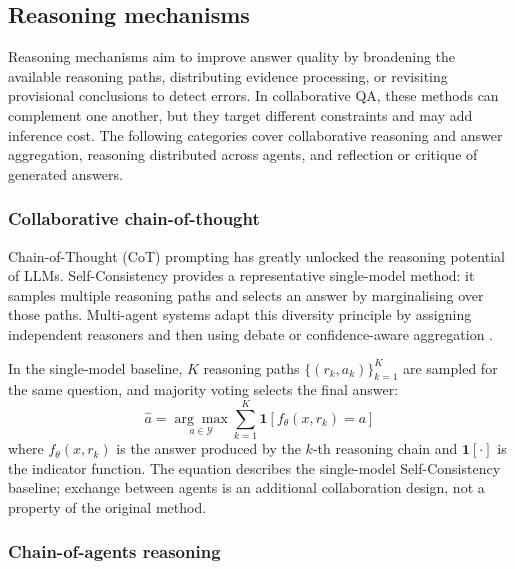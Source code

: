 \documentclass[a4paper,fleqn]{cas-dc}
\begin{document}
\subsection{Reasoning mechanisms}
\label{sec:reasoning}

Reasoning mechanisms aim to improve answer quality by broadening
the available reasoning paths, distributing evidence processing, or revisiting
provisional conclusions to detect errors. In collaborative QA, these methods
can complement one another, but they target different constraints and may add
inference cost. The following categories cover collaborative reasoning and
answer aggregation, reasoning distributed across agents, and reflection or
critique of generated answers.

\subsubsection{Collaborative chain-of-thought}
\label{sec:cot}

Chain-of-Thought (CoT) prompting \citep{wei2022chain_of_thought} has
greatly unlocked the reasoning potential of LLMs.
Self-Consistency \citep{wang2023self_consistency} provides a representative
single-model method: it samples multiple reasoning paths and selects an answer
by marginalising over those paths. Multi-agent systems adapt this diversity
principle by assigning independent
reasoners and then using debate or confidence-aware aggregation
\citep{du2024multiagent_debate,chen2024reconcile}.

In the single-model baseline, $K$ reasoning paths
$\{(r_k, a_k)\}_{k=1}^{K}$ are sampled for the same question, and majority
voting selects the final answer:
\begin{equation}
  \hat{a} = \underset{a\in\mathcal{Y}}{\arg\max}\sum_{k=1}^{K}
  \mathbf{1}\!\left[f_\theta(x,r_k)=a\right]
  \label{eq:self_consistency}
\end{equation}
where $f_\theta(x,r_k)$ is the answer produced by the $k$-th reasoning
chain and $\mathbf{1}[\cdot]$ is the indicator function.
The equation describes the single-model Self-Consistency baseline; exchange
between agents is an additional collaboration design, not a property of the
original method.

\subsubsection{Chain-of-agents reasoning}
\label{sec:chain_of_agents}
\end{document}
